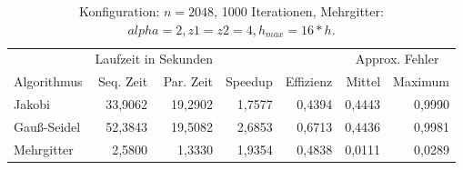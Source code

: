 \documentclass[paper = a4]{scrartcl}
\begin{document}
\begin{table}
    \centering
    \begin{tabular}{|l|r|r|r|r|r|r|} \hline
    & \multicolumn{2}{c|}{Laufzeit in Sekunden} & & & \multicolumn{2}{c|}{Approx. Fehler} \\
    Algorithmus & Seq. Zeit & Par. Zeit & Speedup & Effizienz & Mittel   & Maximum \\ \hline \hline
    Jakobi      & 33,9062   & 19,2902   & 1,7577  & 0,4394    & 0,4443   & 0,9990  \\
    Gauß-Seidel & 52,3843   & 19,5082   & 2,6853  & 0,6713    & 0,4436   & 0,9981  \\
    Mehrgitter  & 2,5800    & 1,3330    & 1,9354  & 0,4838    & 0,0111   & 0,0289  \\ \hline
    \end{tabular}
    \caption{Konfiguration: \(n=2048\), 1000 Iterationen, Mehrgitter: \(alpha=2, z1=z2=4, h_{max}=16*h\).}
    \label{tab:f}
\end{table}
\end{document}
